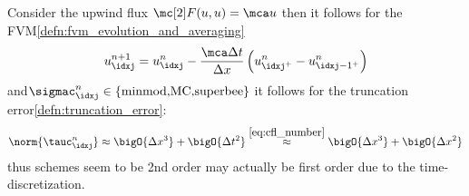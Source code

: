 \begin{examplebox}\nospacing
    \begin{example}[\hfill$\flux(u)=\mca u,\quad\mca>0$\newline Why do we need Semi-Disc. FVS\cref{defn:semi_discrete_fvm}]\label{example:defn:semi_discrete_fvm}
        Consider the upwind flux $\Flux(u,u)=\mca u$ then it follows for the FVM\cref{defn:fvm_evolution_and_averaging}
        \begin{align}
          u_{\idxj}^{n+1}=u_{\idxj}^{n}-\frac{\mca\Delta t}{\Delta x}
          \left(u_{\idxj^{+}}^{n}-u_{\idxj-1^{+}}^{n}\right)
        \end{align}
        and$\sigmac_{\idxj}^{n}\in\{\text{minmod,MC,superbee}\}$
        it follows for the truncation error\cref{defn:truncation_error}:
        \begin{align*}
          \norm{\tauc_{\idxj}^{n}}\approx\bigO{\Delta x^{3}}+\bigO{\Delta t^{2}}\stackrel{\cref{eq:cfl_number}}{\approx}\bigO{\Delta x^{3}}+\bigO{\Delta x^{2}}
        \end{align*}
        thus schemes seem to be 2nd order may actually be first order due to the time-discretization.
    \end{example}
\end{examplebox}
